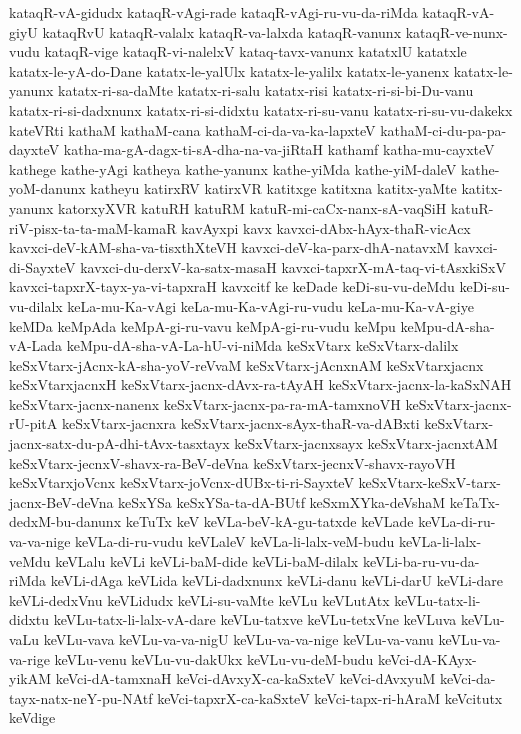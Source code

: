 {kataqR-vA-gidudx
kataqR-vAgi-rade
kataqR-vAgi-ru-vu-da-riMda
kataqR-vA-giyU
kataqRvU
kataqR-valalx
kataqR-va-lalxda
kataqR-vanunx
kataqR-ve-nunx-vudu
kataqR-vige
kataqR-vi-nalelxV
kataq-tavx-vanunx
katatxlU
katatxle
katatx-le-yA-do-Dane
katatx-le-yalUlx
katatx-le-yalilx
katatx-le-yanenx
katatx-le-yanunx
katatx-ri-sa-daMte
katatx-ri-salu
katatx-risi
katatx-ri-si-bi-Du-vanu
katatx-ri-si-dadxnunx
katatx-ri-si-didxtu
katatx-ri-su-vanu
katatx-ri-su-vu-dakekx
kateVRti
kathaM
kathaM-cana
kathaM-ci-da-va-ka-lapxteV
kathaM-ci-du-pa-pa-dayxteV
katha-ma-gA-dagx-ti-sA-dha-na-va-jiRtaH
kathamf
katha-mu-cayxteV
kathege
kathe-yAgi
katheya
kathe-yanunx
kathe-yiMda
kathe-yiM-daleV
kathe-yoM-danunx
katheyu
katirxRV
katirxVR
katitxge
katitxna
katitx-yaMte
katitx-yanunx
katorxyXVR
katuRH
katuRM
katuR-mi-caCx-nanx-sA-vaqSiH
katuR-riV-pisx-ta-ta-maM-kamaR
kavAyxpi
kavx
kavxci-dAbx-hAyx-thaR-vicAcx
kavxci-deV-kAM-sha-va-tisxthXteVH
kavxci-deV-ka-parx-dhA-natavxM
kavxci-di-SayxteV
kavxci-du-derxV-ka-satx-masaH
kavxci-tapxrX-mA-taq-vi-tAsxkiSxV
kavxci-tapxrX-tayx-ya-vi-tapxraH
kavxcitf
ke
keDade
keDi-su-vu-deMdu
keDi-su-vu-dilalx
keLa-mu-Ka-vAgi
keLa-mu-Ka-vAgi-ru-vudu
keLa-mu-Ka-vA-giye
keMDa
keMpAda
keMpA-gi-ru-vavu
keMpA-gi-ru-vudu
keMpu
keMpu-dA-sha-vA-Lada
keMpu-dA-sha-vA-La-hU-vi-niMda
keSxVtarx
keSxVtarx-dalilx
keSxVtarx-jAcnx-kA-sha-yoV-reVvaM
keSxVtarx-jAcnxnAM
keSxVtarxjacnx
keSxVtarxjacnxH
keSxVtarx-jacnx-dAvx-ra-tAyAH
keSxVtarx-jacnx-la-kaSxNAH
keSxVtarx-jacnx-nanenx
keSxVtarx-jacnx-pa-ra-mA-tamxnoVH
keSxVtarx-jacnx-rU-pitA
keSxVtarx-jacnxra
keSxVtarx-jacnx-sAyx-thaR-va-dABxti
keSxVtarx-jacnx-satx-du-pA-dhi-tAvx-tasxtayx
keSxVtarx-jacnxsayx
keSxVtarx-jacnxtAM
keSxVtarx-jecnxV-shavx-ra-BeV-deVna
keSxVtarx-jecnxV-shavx-rayoVH
keSxVtarxjoVcnx
keSxVtarx-joVcnx-dUBx-ti-ri-SayxteV
keSxVtarx-keSxV-tarx-jacnx-BeV-deVna
keSxYSa
keSxYSa-ta-dA-BUtf
keSxmXYka-deVshaM
keTaTx-dedxM-bu-danunx
keTuTx
keV
keVLa-beV-kA-gu-tatxde
keVLade
keVLa-di-ru-va-va-nige
keVLa-di-ru-vudu
keVLaleV
keVLa-li-lalx-veM-budu
keVLa-li-lalx-veMdu
keVLalu
keVLi
keVLi-baM-dide
keVLi-baM-dilalx
keVLi-ba-ru-vu-da-riMda
keVLi-dAga
keVLida
keVLi-dadxnunx
keVLi-danu
keVLi-darU
keVLi-dare
keVLi-dedxVnu
keVLidudx
keVLi-su-vaMte
keVLu
keVLutAtx
keVLu-tatx-li-didxtu
keVLu-tatx-li-lalx-vA-dare
keVLu-tatxve
keVLu-tetxVne
keVLuva
keVLu-vaLu
keVLu-vava
keVLu-va-va-nigU
keVLu-va-va-nige
keVLu-va-vanu
keVLu-va-va-rige
keVLu-venu
keVLu-vu-dakUkx
keVLu-vu-deM-budu
keVci-dA-KAyx-yikAM
keVci-dA-tamxnaH
keVci-dAvxyX-ca-kaSxteV
keVci-dAvxyuM
keVci-da-tayx-natx-neY-pu-NAtf
keVci-tapxrX-ca-kaSxteV
keVci-tapx-ri-hAraM
keVcitutx
keVdige
}
